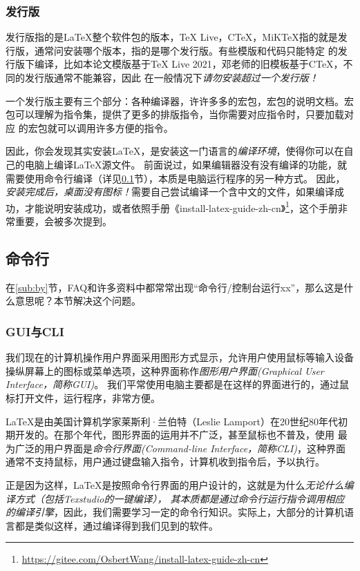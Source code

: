 \subsubsection{发行版}\label{subsub:fxb}


发行版指的是\LaTeX{}整个软件包的版本，\TeX{} Live，C\TeX{}，MiK\TeX{}指的就是发行版，通常问安装哪个版本，指的是哪个发行版。有些模版和代码只能特定
的发行版下编译，比如本论文模版基于\TeX{} Live 2021，邓老师的旧模板基于C\TeX{}，不同的发行版通常不能兼容，因此
在一般情况下\emph{请勿安装超过一个发行版！}

一个发行版主要有三个部分：各种编译器，许许多多的宏包，宏包的说明文档。宏包可以理解为指令集，提供了更多的排版指令，当你需要对应指令时，只要加载对应
的宏包就可以调用许多方便的指令。

因此，你会发现其实安装\LaTeX{}，是安装这一门语言的\emph{编译环境}，使得你可以在自己的电脑上编译\LaTeX{}源文件。
前面说过，如果编辑器没有没有编译的功能，就需要使用命令行编译（详见\ref{subsec:mlh}节），本质是电脑运行程序的另一种方式。
因此，\emph{安装完成后，桌面没有图标！}需要自己尝试编译一个含中文的文件，如果编译成功，才能说明安装成功，或者依照手册《install-latex-guide-zh-cn》\footnote{\url{https://gitee.com/OsbertWang/install-latex-guide-zh-cn}}，这个手册非常重要，会被多次提到。




\subsection{命令行}\label{subsec:mlh}
在\ref{sub:by}节，FAQ和许多资料中都常常出现“命令行/控制台运行xx”，那么这是什么意思呢？本节解决这个问题。

\subsubsection{GUI与CLI}


我们现在的计算机操作用户界面采用图形方式显示，允许用户使用鼠标等输入设备操纵屏幕上的图标或菜单选项，这种界面称作\emph{图形用户界面(Graphical User Interface，简称GUI)}。
我们平常使用电脑主要都是在这样的界面进行的，通过鼠标打开文件，运行程序，非常方便。

\LaTeX{}是由美国计算机学家莱斯利·兰伯特（Leslie Lamport）在20世纪80年代初期开发的。在那个年代，图形界面的运用并不广泛，甚至鼠标也不普及，使用
最为广泛的用户界面是\emph{命令行界面(Command-line Interface，简称CLI)}，这种界面通常不支持鼠标，用户通过键盘输入指令，计算机收到指令后，予以执行。

正是因为这样，\LaTeX{}是按照命令行界面的用户设计的，这就是为什么\emph{无论什么编译方式（包括Texstudio的一键编译），
其本质都是通过命令行运行指令调用相应的编译引擎}，因此，我们需要学习一定的命令行知识。实际上，大部分的计算机语言都是类似这样，通过编译得到我们见到的软件。




